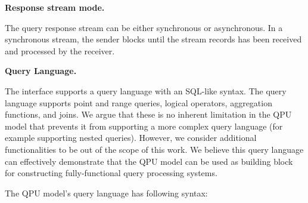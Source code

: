 \bigskip
\noindent
\textbf{Response stream mode.}

\noindent
The query response stream can be either synchronous or asynchronous.
In a synchronous stream, the sender blocks until the stream records has been received and processed by the receiver.

\bigskip
\noindent
\textbf{Query Language.}

\noindent
The interface supports a query language with an SQL-like syntax.
The query language supports point and range queries, logical operators, aggregation functions, and joins.
We argue that these is no inherent limitation in the QPU model that prevents it from supporting a more complex
query language (for example supporting nested queries).
However, we consider additional functionalities to be out of the scope of this work.
We believe this query language can effectively demonstrate that the QPU model can be used as building
block for constructing fully-functional query processing systems.

The QPU model's query language has following syntax:

